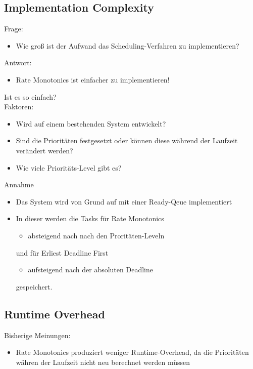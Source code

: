 \subsection{Implementation Complexity}
\begin{frame}{\subsecname}
	Frage:
	\begin{itemize}
		\item Wie groß ist der Aufwand das Scheduling-Verfahren zu implementieren?
	\end{itemize}
	Antwort:
	\begin{itemize}
		\item Rate Monotonics ist einfacher zu implementieren!
	\end{itemize}
\end{frame}

\begin{frame}{\subsecname}
	Ist es so einfach?\\\pause
	Faktoren:
	\begin{itemize}
		\item Wird auf einem bestehenden System entwickelt?
		\item Sind die Prioritäten festgesetzt oder können diese während der Laufzeit verändert werden?
		\item Wie viele Prioritäts-Level gibt es? %
	\end{itemize}
\end{frame}

\begin{frame}{\subsecname}
	Annahme
	\begin{itemize}
		\item Das System wird von Grund auf mit einer Ready-Qeue implementiert\pause
		\item In dieser werden die Tasks für Rate Monotonics
			\begin{itemize}
				\item absteigend nach nach den Proritäten-Leveln
			\end{itemize}
			und für Erliest Deadline First
			\begin{itemize}
				\item aufsteigend nach der absoluten Deadline
			\end{itemize} gespeichert.
	\end{itemize}
\end{frame}

\subsection{Runtime Overhead}
\begin{frame}{\subsecname}
	Bisherige Meinungen:
	\begin{itemize}
		\item Rate Monotonics produziert weniger Runtime-Overhead, da die Prioritäten währen der Laufzeit nicht neu berechnet werden müssen
	\end{itemize}
\end{frame}

